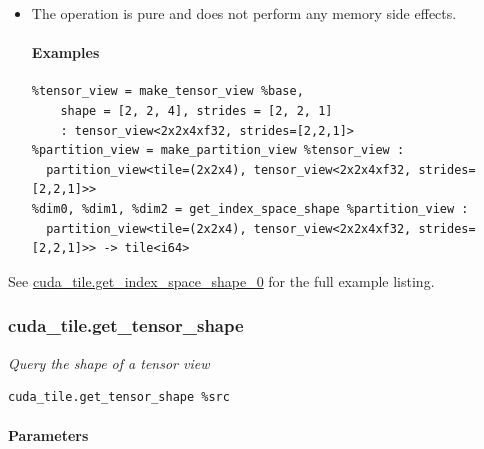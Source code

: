 \documentclass{article}
\begin{document}
\begin{itemize}
\item The operation is pure and does not perform any memory side effects.


\paragraph{Examples}

\begin{lstlisting}
%tensor_view = make_tensor_view %base,
    shape = [2, 2, 4], strides = [2, 2, 1]
    : tensor_view<2x2x4xf32, strides=[2,2,1]>
%partition_view = make_partition_view %tensor_view :
  partition_view<tile=(2x2x4), tensor_view<2x2x4xf32, strides=[2,2,1]>>
%dim0, %dim1, %dim2 = get_index_space_shape %partition_view :
  partition_view<tile=(2x2x4), tensor_view<2x2x4xf32, strides=[2,2,1]>> -> tile<i64>
\end{lstlisting}

\end{itemize}
See \href{https://docs.nvidia.com/cuda/tile-ir/latest/sections/appendix.html#example-cuda-tile-get-index-space-shape-0}{cuda\_tile.get\_index\_space\_shape\_0} for the full example listing.



\subsubsection{cuda\_tile.get\_tensor\_shape}

\textit{Query the shape of a tensor view}


\begin{lstlisting}
cuda_tile.get_tensor_shape %src
\end{lstlisting}

\paragraph{Parameters}
\end{document}
